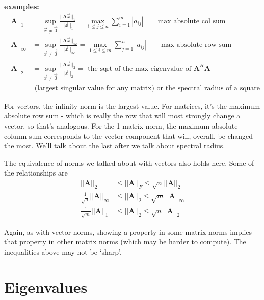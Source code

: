 \documentclass[12pt]{article}
\newcommand{\ve}[1]{\ensuremath{\mathbf{#1}}}
\begin{document}
\textbf{examples:}
%
\begin{align}
||\ve{A}||_{1} &= \displaystyle \sup_{\vec{x} \neq \vec{0}} \frac{||\ve{A}\vec{x}||_{1}}{||\vec{x}||_{1}} =
\displaystyle \max_{1 \leq j \leq n} \sum_{i=1}^m |a_{ij}| \qquad \text{max absolute col sum} \nonumber \\
%
||\ve{A}||_{\infty} &= \displaystyle \sup_{\vec{x} \neq \vec{0}} \frac{||\ve{A}\vec{x}||_{\infty}}{||\vec{x}||_{\infty}} = 
\displaystyle \max_{1 \leq i \leq m} \sum_{j=1}^n |a_{ij}| \qquad \text{max absolute row sum}\nonumber \\
%
||\ve{A}||_{2} &= \displaystyle \sup_{\vec{x} \neq \vec{0}} \frac{||\ve{A}\vec{x}||_{2}}{||\vec{x}||_{2}} = \text{ the sqrt of the max  eigenvalue of }\ve{A}^H\ve{A} \nonumber \\
&\text{ (largest singular value for any matrix) or the spectral radius of a square matrix} \nonumber 
\end{align}

For vectors, the infinity norm is the largest value. For matrices, it's the maximum absolute row sum - which is really the row that will most strongly change a vector, so that's analogous. For the 1 matrix norm, the maximum absolute column sum corresponds to the vector component that will, overall, be changed the most. We'll talk about the last after we talk about spectral radius.

The equivalence of norms we talked about with vectors also holds here. Some of the relationships are
%
\begin{align}
||\ve{A}||_{2} &\leq ||\ve{A}||_{F} \leq \sqrt{n}||\ve{A}||_{2} \nonumber \\
%
\frac{1}{\sqrt{n}}||\ve{A}||_{\infty} &\leq ||\ve{A}||_{2} \leq \sqrt{m}||\ve{A}||_{\infty} \nonumber \\
%
\frac{1}{\sqrt{m}}||\ve{A}||_{1} &\leq ||\ve{A}||_{2} \leq \sqrt{n}||\ve{A}||_{2} \nonumber
\end{align}

Again, as with vector norms, showing a property in some matrix norms implies that property in other matrix norms (which may be harder to compute). The inequalities above may not be `sharp'.


\section{Eigenvalues}
\end{document}
